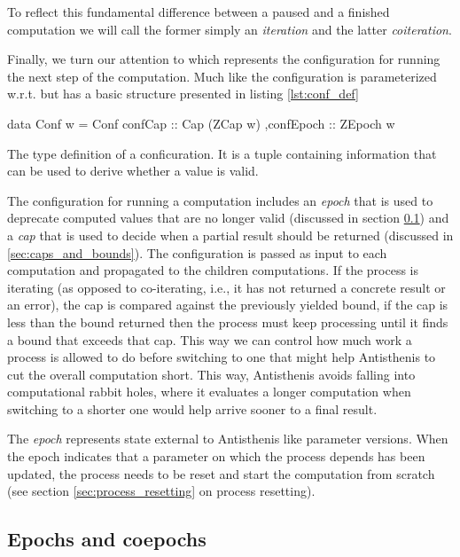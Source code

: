 To reflect this fundamental difference between a paused and a finished
computation we will call the former simply an \emph{iteration} and the
latter \emph{coiteration}.

Finally, we turn our attention to  which represents the
configuration for running the next step of the computation. Much like
 the configuration is parameterized w.r.t.  but has
a basic structure presented in listing \ref{lst:conf_def}

\begin{code}
\begin{haskellcode}
data Conf w =
  Conf { confCap :: Cap (ZCap w)
        ,confEpoch :: ZEpoch w
       }
\end{haskellcode}
  \caption{\label{lst:conf_def}The type definition of a
    conficuration. It is a tuple containing information that can be
    used to derive whether a value is valid.}
\end{code}

The configuration for running a computation includes an \emph{epoch}
that is used to deprecate computed values that are no longer valid
(discussed in section \ref{sec:epochs_coepochs}) and a \emph{cap} that
is used to decide when a partial result should be returned (discussed
in \ref{sec:caps_and_bounds}). The configuration is passed as input to
each computation and propagated to the children computations. If the
process is iterating (as opposed to co-iterating, i.e., it has not
returned a concrete result or an error), the cap is compared against
the previously yielded bound, if the cap is less than the bound
returned then the process must keep processing until it finds a bound
that exceeds that cap. This way we can control how much work a process
is allowed to do before switching to one that might help Antisthenis
to cut the overall computation short. This way, Antisthenis avoids
falling into computational rabbit holes, where it evaluates a longer
computation when switching to a shorter one would help arrive sooner
to a final result.

The \emph{epoch} represents state external to Antisthenis like
parameter versions. When the epoch indicates that a parameter on which
the process depends has been updated, the process needs to be reset
and start the computation from scratch (see section
\ref{sec:process_resetting} on process resetting).


\subsection{Epochs and coepochs}
\label{sec:epochs_coepochs}

